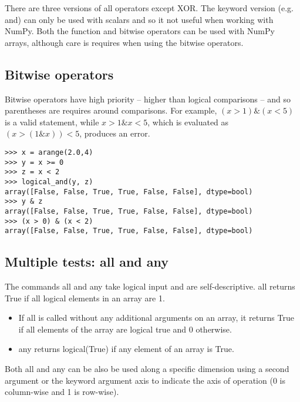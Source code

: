 \documentclass[KSmain.tex]{subfiles}
\begin{document}
There are three versions of all operators except XOR. The keyword version (e.g. and) can only be used
with scalars and so it not useful when working with NumPy. Both the function and bitwise operators
can be used with NumPy arrays, although care is requires when using the bitwise operators.
 \subsection{Bitwise operators}
Bitwise operators have high priority – higher than logical comparisons – and so parentheses are requires around
comparisons. 
For example, $(x>1) \& (x<5)$ is a valid statement, while $x>1 \& x<5$, which is evaluated as
$(x>(1 \& x))<5$, produces an error.
\begin{framed}
\begin{verbatim}
>>> x = arange(2.0,4)
>>> y = x >= 0
>>> z = x < 2
>>> logical_and(y, z)
array([False, False, True, True, False, False], dtype=bool)
>>> y & z
array([False, False, True, True, False, False], dtype=bool)
>>> (x > 0) & (x < 2)
array([False, False, True, True, False, False], dtype=bool)
\end{verbatim}
\end{framed}
\subsection{Multiple tests: all and any}
The commands all and any take logical input and are self-descriptive. all returns True if all logical elements
in an array are 1.
\begin{itemize}
\item  If all is called without any additional arguments on an array, it returns True if all
elements of the array are logical true and 0 otherwise. 
\item 
any returns logical(True) if any element of an array is True.
\end{itemize}
Both all and any can be also be used along a specific dimension using a second argument or the
keyword argument axis to indicate the axis of operation (0 is column-wise and 1 is row-wise). 
\end{document}

